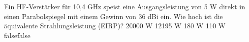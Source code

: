     {Ein HF-Verstärker für 10,4 GHz speist eine Ausgangsleistung von 5 W direkt in einen Parabolspiegel mit einem Gewinn von 36 dBi ein. Wie hoch ist die äquivalente Strahlungsleistung (EIRP)?}
    {20000 W}
    {12195 W}
    {180 W}
    {110 W}
    {false}{false}